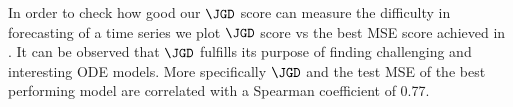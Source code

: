 In order to check how good our $\JGD$ score can measure the difficulty in forecasting of a time series we plot $\JGD$ score vs the best MSE score achieved in .
It can be observed that $\JGD$ fulfills its purpose of
finding challenging and interesting ODE models. More specifically $\JGD$ and the test MSE of the
best performing model are correlated with a Spearman coefficient of 0.77.

\begin{table}
\centering
\caption{%
	Experimental results on various baseline models.
	\Bench~datasets ranked by $\JGD$-score.
	We highlight the best model in \textbf{bold}
	and  the second best.
}\label{tab:main_results}
\scriptsize
\scalebox{0.95}{

}
\end{table}
